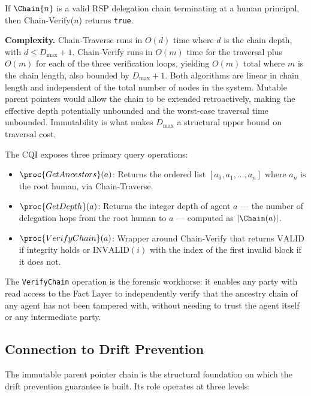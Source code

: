 \begin{prop}
\label{prop:chain_verify_completeness}
If $\Chain{n}$ is a valid RSP delegation chain terminating at a human principal, then Chain-Verify($n$) returns \texttt{true}.
\end{prop}

\textbf{Complexity.} Chain-Traverse runs in $O(d)$ time where $d$ is the chain depth, with $d \leq D_{\max} + 1$. Chain-Verify runs in $O(m)$ time for the traversal plus $O(m)$ for each of the three verification loops, yielding $O(m)$ total where $m$ is the chain length, also bounded by $D_{\max} + 1$. Both algorithms are linear in chain length and independent of the total number of nodes in the system. Mutable parent pointers would allow the chain to be extended retroactively, making the effective depth potentially unbounded and the worst-case traversal time unbounded. Immutability is what makes $D_{\max}$ a structural upper bound on traversal cost.

The CQI exposes three primary query operations:
\begin{itemize}
    \item $\proc{GetAncestors}(a)$: Returns the ordered list $[a_0, a_1, \ldots, a_n]$ where $a_n$ is the root human, via Chain-Traverse.
    \item $\proc{GetDepth}(a)$: Returns the integer depth of agent $a$ — the number of delegation hops from the root human to $a$ — computed as $|\Chain(a)|$.
    \item $\proc{VerifyChain}(a)$: Wrapper around Chain-Verify that returns $\mathrm{VALID}$ if integrity holds or $\mathrm{INVALID}(i)$ with the index of the first invalid block if it does not.
\end{itemize}

The \texttt{VerifyChain} operation is the forensic workhorse: it enables any party with read access to the Fact Layer to independently verify that the ancestry chain of any agent has not been tampered with, without needing to trust the agent itself or any intermediate party.

\subsection{Connection to Drift Prevention}
\label{sec:drift_prevention_connection}

The immutable parent pointer chain is the structural foundation on which the drift prevention guarantee is built. Its role operates at three levels:


